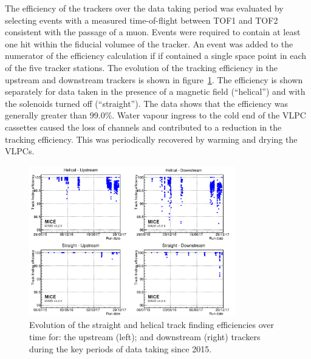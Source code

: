 The efficiency of the trackers over the data taking period was
evaluated by selecting events with a measured time-of-flight between
TOF1 and TOF2 consistent with the passage of a muon.
Events were required to contain at least one hit within the fiducial
volumee of the tracker.
An event was added to the numerator of the efficiency calculation if
if contained a single space point in each of the five tracker
stations.
The evolution of the tracking efficiency in the upstream and
downstream trackers is shown in
figure~\ref{fig:trackers:performance:historical}.
The efficiency is shown separately for data taken in the presence of a
magnetic field (``helical'') and with the solenoids turned off
(``straight'').
The data shows that the efficiency was generally greater than 99.0\%.
Water vapour ingress to the cold end of the VLPC cassettes caused the loss of
channels and contributed to a reduction in the tracking efficiency.
This was periodically recovered by warming and drying the VLPCs. \\
\begin{figure}
  \begin{center}
    \includegraphics[width=0.80\textwidth]{historical_analysis_plot_logo.png}
  \end{center}
  \caption{
    Evolution of the straight and helical track finding efficiencies
    over time for: the upstream (left); and downstream (right) trackers
    during the key periods of data taking since 2015.
  }
  \label{fig:trackers:performance:historical} 
\end{figure}


